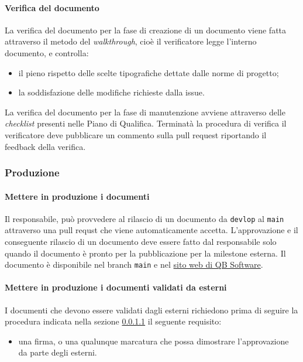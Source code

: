         \paragraph{Verifica del documento} \label{sec:doc_verification}
            La verifica del documento per la fase di creazione di un documento viene fatta attraverso il metodo del \emph{walkthrough}, cioè il verificatore legge l'interno documento, e controlla:
                \begin{itemize}
                    \item il pieno rispetto delle scelte tipografiche dettate dalle norme di progetto;
                    \item la soddisfazione delle modifiche richieste dalla issue.
                \end{itemize}
            La verifica del documento per la fase di manutenzione avviene attraverso delle \emph{checklist} presenti nelle Piano di Qualifica. Terminatà la procedura di verifica il verificatore deve pubblicare un commento sulla pull request riportando il feedback della verifica.
            
    \subsubsection{Produzione} 
        \paragraph{Mettere in produzione i documenti} \label{sec:doc_production}
            Il responsabile, può provvedere al rilascio di un documento da \verb|devlop| al \verb|main| attraverso una pull requst che viene automaticamente accetta. L'approvazione e il conseguente rilascio di un documento deve essere fatto dal responsabile solo quando il documento è pronto per la pubblicazione per la milestone esterna. Il documento è disponibile nel branch \verb|main| e nel \href{https://qb-software-swe.github.io/docs/}{sito web di QB Software}.
            
        \paragraph{Mettere in produzione i documenti validati da esterni}
        	I documenti che devono essere validati dagli esterni richiedono prima di seguire la procedura indicata nella sezione \ref{sec:doc_production} il seguente requisito:
        	\begin{itemize}
        		\item una firma, o una qualunque marcatura che possa dimostrare l'approvazione da parte degli esterni.
        	\end{itemize}

